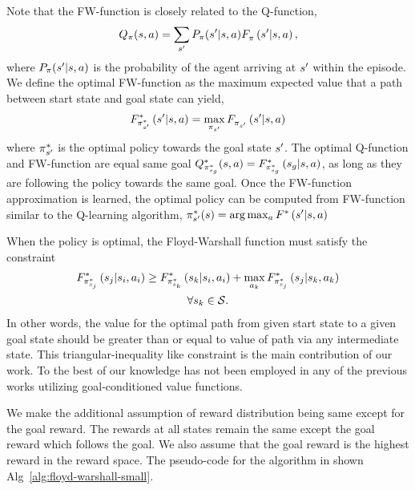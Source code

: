 Note that the FW-function is closely related to the Q-function,
\begin{align}
  \Q_\policy(\state, \act) = \sum_{\state'} P_\policy(\state' | \state, \act) \fwargs{\state}{\act}{\state'}{\policy}{},
\end{align}%
%
where $P_\policy(\state' | \state, \act)$ is the probability of the agent
arriving at $\state'$ within the episode. We define the optimal FW-function as
the maximum expected value that a path between start state and goal state can
yield,
\begin{align}
\fwargs{\state}{\act}{\state'}{\policy^*_{\state'}}{*} =
\max_{\policy_{\state'}}  \fwargs{\state}{\act}{\state'}{\policy_{\state'}}{}
\end{align}%
where $\policy^*_{\state'}$ is the
optimal policy towards the goal state $\state'$. The optimal Q-function and
FW-function are equal same goal
$\Q^*_{\policy^*_{\state_g}}(\state, \act) =
  \fwargs{\state}{\act}{\state_g}{\policy^*_{\state_g}}{*}$,
as long as they are following the policy towards the same goal. Once the
FW-function approximation is learned, the optimal policy can be computed from
FW-function similar to the Q-learning algorithm, $\policy^*_{\state'}(\state) =
\arg \max_{\act} \fwargs{\state}{\act}{\state'}{}{*}$

When the policy is optimal, the Floyd-Warshall function must satisfy the
constraint
%
\begin{multline}
\fwargs{\state_i}{\act_i}{\state_j}{\policy^*_{\state_j}}{*}
 \ge 
  \fwargs{\state_i}{\act_i}{\state_k}{\policy^*_{\state_k}}{*}
  + \max_{\act_k}\fwargs{\state_k}{\act_k}{\state_j}{\policy^*_{\state_j}}{*}
  \\
  \forall \state_k \in \State.
\end{multline}%
%
In other words, the value for the optimal path from given start state to a given
goal state should be greater than or equal to value of path via any intermediate
state.
This triangular-inequality like constraint is the main contribution of our work.
To the best of our knowledge has not been employed in any of the previous works
utilizing goal-conditioned value functions.

We make the additional assumption of reward distribution being same except for
the goal reward. The rewards at all states remain the same except the goal
reward which follows the goal. We also assume that the goal reward is the
highest reward in the reward space.
The pseudo-code for the algorithm in shown Alg~\ref{alg:floyd-warshall-small}.




